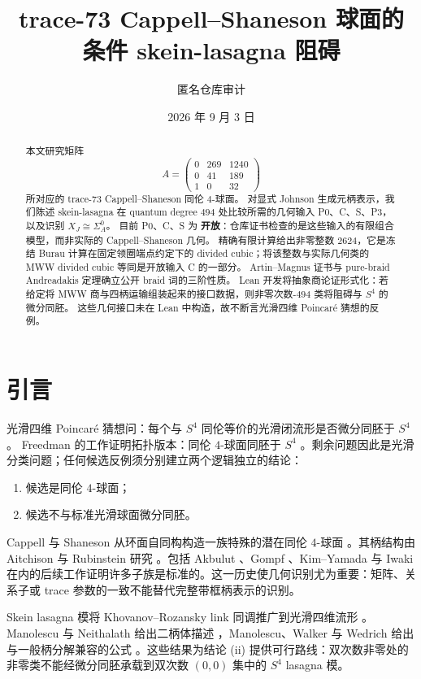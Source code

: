 \documentclass[11pt]{amsart}
\title[trace-73 条件性阻碍]
{trace-73 Cappell--Shaneson 球面的\\
条件 skein-lasagna 阻碍}
\author{匿名仓库审计}
\date{2026 年 9 月 3 日}
\theoremstyle{definition}
\theoremstyle{remark}
\newcommand{\Open}{\textbf{开放}}
\begin{document}
\begin{abstract}
本文研究矩阵
\[
A=\begin{pmatrix}0&269&1240\\0&41&189\\1&0&32\end{pmatrix}
\]
所对应的 trace-73 Cappell--Shaneson 同伦 $4$-球面。
对显式 Johnson 生成元柄表示，我们陈述 skein-lasagna 在 quantum degree $494$ 处比较所需的几何输入 P0、C、S、P3，以及识别 $X_J\cong\Sigma_A^0$。
目前 P0、C、S 为 \Open：仓库证书检查的是这些输入的有限组合模型，而非实际的 Cappell--Shaneson 几何。
精确有限计算给出非零整数 $2624$，它是冻结 Burau 计算在固定领圈端点约定下的 divided cubic；将该整数与实际几何类的 MWW divided cubic 等同是开放输入 C 的一部分。
Artin--Magnus 证书与 pure-braid Andreadakis 定理确立公开 braid 词的三阶性质。
Lean 开发将抽象商论证形式化：若给定将 MWW 商与四柄运输组装起来的接口数据，则非零次数-$494$ 类将阻碍与 $S^4$ 的微分同胚。
这些几何接口未在 Lean 中构造，故不断言光滑四维 Poincaré 猜想的反例。
\end{abstract}

\maketitle
\tableofcontents
\section{引言}

光滑四维 Poincaré 猜想问：每个与 $S^4$ 同伦等价的光滑闭流形是否微分同胚于 $S^4$。
Freedman 的工作证明拓扑版本：同伦 $4$-球面同胚于 $S^4$ \cite{Freedman1982}。剩余问题因此是光滑分类问题；任何候选反例须分别建立两个逻辑独立的结论：
\begin{enumerate}
\item 候选是同伦 $4$-球面；
\item 候选不与标准光滑球面微分同胚。
\end{enumerate}

Cappell 与 Shaneson 从环面自同构构造一族特殊的潜在同伦 $4$-球面 \cite{CappellShaneson1976}。其柄结构由 Aitchison 与 Rubinstein 研究 \cite{AitchisonRubinstein1984}。包括 Akbulut \cite{Akbulut2010}、Gompf \cite{Gompf2010}、Kim--Yamada \cite{KimYamada2017} 与 Iwaki \cite{Iwaki2024} 在内的后续工作证明许多子族是标准的。这一历史使几何识别尤为重要：矩阵、关系子或 trace 参数的一致不能替代完整带框柄表示的识别。

Skein lasagna 模将 Khovanov--Rozansky link 同调推广到光滑四维流形 \cite{MorrisonWalkerWedrich2019}。Manolescu 与 Neithalath 给出二柄体描述 \cite{ManolescuNeithalath2020}，Manolescu、Walker 与 Wedrich 给出与一般柄分解兼容的公式 \cite{ManolescuWalkerWedrich2023}。这些结果为结论 (ii) 提供可行路线：双次数非零处的非零类不能经微分同胚承载到双次数 $(0,0)$ 集中的 $S^4$ lasagna 模。
\end{document}
